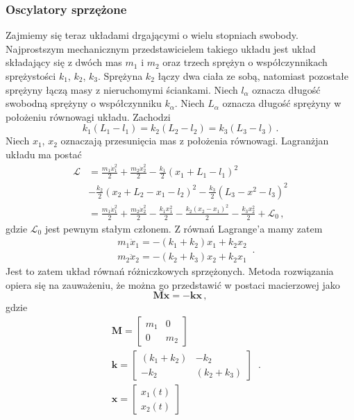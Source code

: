 \documentclass[../main.tex]{subfiles}
\begin{document}
    \subsubsection{Oscylatory sprzężone}
    Zajmiemy się teraz układami drgającymi o wielu stopniach swobody. Najprostszym mechanicznym
    przedstawicielem takiego układu jest układ składający się z dwóch mas \(m_1\) i \(m_2\) oraz
    trzech sprężyn o współczynnikach sprężystości \(k_1\), \(k_2\), \(k_3\). Sprężyna \(k_2\) łączy
    dwa ciała ze sobą, natomiast pozostałe sprężyny łączą masy z nieruchomymi ściankami. Niech
    \(l_\alpha\) oznacza długość swobodną sprężyny o współczynniku \(k_\alpha\). Niech \(L_\alpha\)
    oznacza długość sprężyny w położeniu równowagi układu. Zachodzi 
    \begin{equation*}
        k_1(L_1-l_1)=k_2(L_2-l_2)=k_3(L_3-l_3)\,.
    \end{equation*}
    Niech \(x_1\), \(x_2\) oznaczają przesunięcia mas z położenia równowagi. Lagranżjan układu ma
    postać
    \begin{equation*}
    \begin{split}
        \mathcal{L}&=\frac{m_1\dot{x}_1^2}{2}+\frac{m_2\dot{x}_2^2}{2}-\frac{k_1}{2}(x_1+L_1-l_1)^2\\
        &-\frac{k_2}{2}(x_2+L_2-x_1-l_2)^2-\frac{k_3}{2}(L_3-x^2-l_3)^2\\
        &=\frac{m_1\dot{x}_1^2}{2}+\frac{m_2\dot{x}_2^2}{2}-\frac{k_1x_1^2}{2}-\frac{k_2(x_2-x_1)^2}{2}-\frac{k_3x_2^2}{2}+\mathcal{L}_0\,,
    \end{split}
    \end{equation*}
    gdzie \(\mathcal{L}_0\) jest pewnym stałym członem. Z równań Lagrange'a mamy zatem
    \begin{equation*}
        \begin{split}
            &m_1\ddot x_1=-(k_1+k_2)x_1+k_2x_2\\
            &m_2\ddot x_2=-(k_2+k_3)x_2+k_2x_1
        \end{split}\,.
    \end{equation*}
    Jest to zatem układ równań różniczkowych sprzężonych. Metoda rozwiązania opiera się na
    zauważeniu, że można go przedstawić w postaci macierzowej jako
    \begin{equation*}
        \mathbf{M}\ddot{\mathbf{x}}=-\mathbf{k}\mathbf{x}\,,
    \end{equation*}
    gdzie
    \begin{equation*}
    \begin{split}
        &\mathbf{M}=\begin{bmatrix}m_1&0\\0&m_2 \end{bmatrix}\\
        &\mathbf{k}=\begin{bmatrix}(k_1+k_2)&-k_2\\-k_2&(k_2+k_3) \end{bmatrix}\\
        &\mathbf{x}=\begin{bmatrix}x_1(t)\\x_2(t) \end{bmatrix}
    \end{split}\,.
    \end{equation*}
\end{document}
